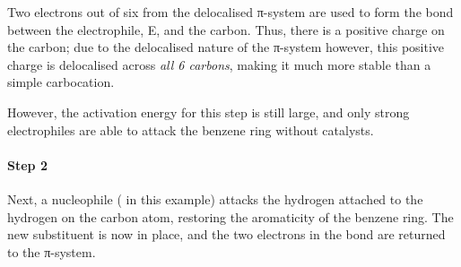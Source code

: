 


		Two electrons out of six from the delocalised π-system are used to form the bond between the electrophile, E, and the carbon.
		Thus, there is a positive charge on the carbon; due to the delocalised nature of the π-system however, this positive charge is
		delocalised across \textit{all 6 carbons}, making it much more stable than a simple carbocation.

		However, the activation energy for this step is still large, and only strong electrophiles are able to attack the benzene ring without catalysts.

		\pagebreak
		\paragraph{Step 2}

		Next, a nucleophile ( in this example) attacks the hydrogen attached to the hydrogen on the carbon atom,
		restoring the aromaticity of the benzene ring. The new substituent is now in place, and the two electrons in the 
		bond are returned to the π-system.




